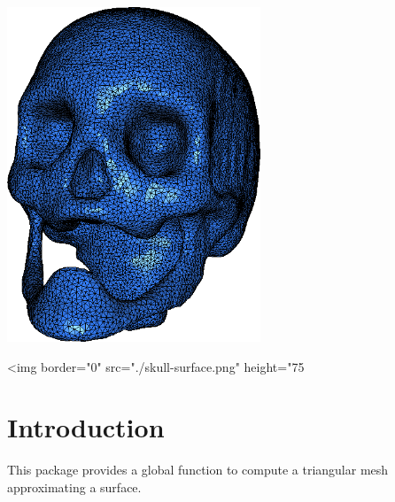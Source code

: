\label{chapter_SurfaceMesher}



\minitoc


\begin{center}
 \begin{ccTexOnly}
   \includegraphics[height=10cm]{Surface_mesher/skull-surface}
 \end{ccTexOnly}
 \begin{ccHtmlOnly}
   <img border="0" src="./skull-surface.png" height="75%
 \end{ccHtmlOnly}
\end{center}

\section{Introduction}
\label{SurfaceMesher_section_intro}

This package provides a global function
to compute a triangular mesh approximating a surface.

